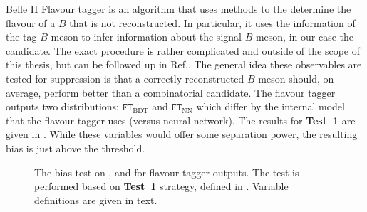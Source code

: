 Belle II Flavour tagger is an algorithm that uses \MVA methods to the determine the flavour of a $B$ that is not reconstructed.
In particular, it uses the information of the tag-$B$ meson to infer information about the signal-$B$ meson, in our case the \BtoXsgamma candidate.
The exact procedure is rather complicated and outside of the scope of this thesis, but can be followed up in Ref.\cite{Belle-II:2021zvj}.
The general idea these observables are tested for \epem\ra\qqbar suppression is that a correctly reconstructed $B$-meson should, on average, perform better than a combinatorial \qqbar candidate.
The flavour tagger outputs two distributions: $\mathtt{FT}_{\mathrm{BDT}}$ and $\mathtt{FT}_{\mathrm{NN}}$ which differ by the internal model that the flavour tagger uses (\BDT versus neural network).
The results for \textbf{Test~1} are given in .
While these variables would offer some separation power, the resulting bias is just above the threshold.

\begin{figure}[htbp!]
    \caption{\label{fig:flavour_tagger_outputs} The bias-test on \EB, \Estar and \Mbc for flavour tagger outputs.
    The test is performed based on \textbf{Test~1} strategy, defined in .
    Variable definitions are given in text.}
\end{figure}
